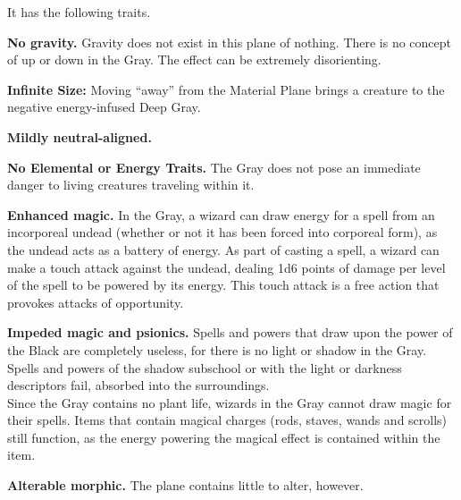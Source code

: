 It has the following traits.
\begin{itemize*}
\item \textbf{No gravity.} Gravity does not exist in this plane of nothing. There is no concept of up or down in the Gray. The effect can be extremely disorienting.
\item \textbf{Infinite Size:} Moving ``away'' from the Material Plane brings a creature to the negative energy-infused Deep Gray.
\item \textbf{Mildly neutral-aligned.}
\item \textbf{No Elemental or Energy Traits.} The Gray does not pose an immediate danger to living creatures traveling within it.
\item \textbf{Enhanced magic.} In the Gray, a wizard can draw energy for a spell from an incorporeal undead (whether or not it has been forced into corporeal form), as the undead acts as a battery of energy. As part of casting a spell, a wizard can make a touch attack against the undead, dealing 1d6 points of damage per level of the spell to be powered by its energy. This touch attack is a free action that provokes attacks of opportunity.
\item \textbf{Impeded magic and psionics.} Spells and powers that draw upon the power of the Black are completely useless, for there is no light or shadow in the Gray. Spells and powers of the shadow subschool or with the light or darkness descriptors fail, absorbed into the surroundings.\\

Since the Gray contains no plant life, wizards in the Gray cannot draw magic for their spells. Items that contain magical charges (rods, staves, wands and scrolls) still function, as the energy powering the magical effect is contained within the item.
\item \textbf{Alterable morphic.} The plane contains little to alter, however.
\end{itemize*}



